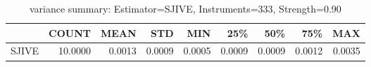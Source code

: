 \begin{table}[ht]
\centering
\caption{variance summary: Estimator=SJIVE, Instruments=333, Strength=0.90}
\begin{tabular}{lrrrrrrrr}
\toprule
 & COUNT & MEAN & STD & MIN & 25\% & 50\% & 75\% & MAX \\
\midrule
SJIVE & 10.0000 & 0.0013 & 0.0009 & 0.0005 & 0.0009 & 0.0009 & 0.0012 & 0.0035 \\
\bottomrule
\end{tabular}
\end{table}
